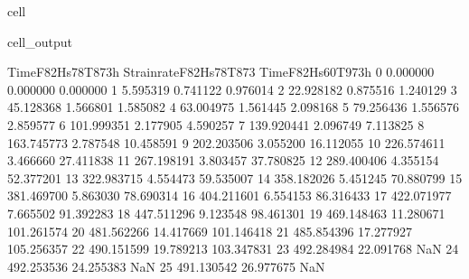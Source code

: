 \documentclass[letterpaper,10pt,english]{jupyterBook}
\begin{document}
\begin{sphinxuseclass}{cell}
\begin{sphinxVerbatimOutput}
			\begin{sphinxuseclass}{cell_output}
				\begin{sphinxVerbatim}[commandchars=\\\{\}]
					Time\PYGZus{}F82Hs78T873h  Strainrate\PYGZus{}F82Hs78T873  Time\PYGZus{}F82Hs60T973h  \PYGZbs{}
					0            0.000000                0.000000           0.000000   
					1            5.595319                0.741122           0.976014   
					2           22.928182                0.875516           1.240129   
					3           45.128368                1.566801           1.585082   
					4           63.004975                1.561445           2.098168   
					5           79.256436                1.556576           2.859577   
					6          101.999351                2.177905           4.590257   
					7          139.920441                2.096749           7.113825   
					8          163.745773                2.787548          10.458591   
					9          202.203506                3.055200          16.112055   
					10         226.574611                3.466660          27.411838   
					11         267.198191                3.803457          37.780825   
					12         289.400406                4.355154          52.377201   
					13         322.983715                4.554473          59.535007   
					14         358.182026                5.451245          70.880799   
					15         381.469700                5.863030          78.690314   
					16         404.211601                6.554153          86.316433   
					17         422.071977                7.665502          91.392283   
					18         447.511296                9.123548          98.461301   
					19         469.148463               11.280671         101.261574   
					20         481.562266               14.417669         101.146418   
					21         485.854396               17.277927         105.256357   
					22         490.151599               19.789213         103.347831   
					23         492.284984               22.091768                NaN   
					24         492.253536               24.255383                NaN   
					25         491.130542               26.977675                NaN   
					

\end{sphinxVerbatim}
\end{sphinxuseclass}
\end{sphinxVerbatimOutput}
\end{sphinxuseclass}
\end{document}
